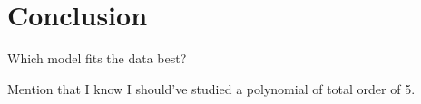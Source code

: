 \section{Conclusion} \label{sec:conclusion}
Which model fits the data best?

Mention that I know I should've studied a polynomial of total order of 5. 